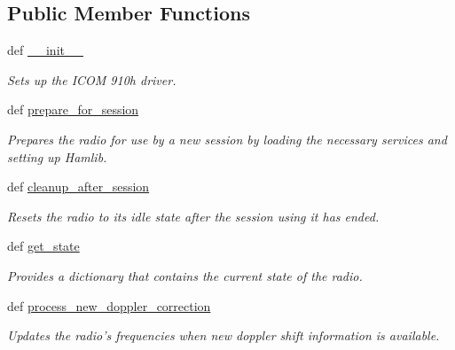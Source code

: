 \subsection*{Public Member Functions}
\begin{DoxyCompactItemize}
\item 
def \hyperlink{classhwm_1_1hardware_1_1devices_1_1drivers_1_1icom__910_1_1icom__910_1_1_i_c_o_m__910_a003a4b4561c4154eed9f426aa65d92a5}{\-\_\-\-\_\-init\-\_\-\-\_\-}
\begin{DoxyCompactList}\small\item\em Sets up the I\-C\-O\-M 910h driver. \end{DoxyCompactList}\item 
def \hyperlink{classhwm_1_1hardware_1_1devices_1_1drivers_1_1icom__910_1_1icom__910_1_1_i_c_o_m__910_ada23b5a1d234988015eb03a81d46f1db}{prepare\-\_\-for\-\_\-session}
\begin{DoxyCompactList}\small\item\em Prepares the radio for use by a new session by loading the necessary services and setting up Hamlib. \end{DoxyCompactList}\item 
\hypertarget{classhwm_1_1hardware_1_1devices_1_1drivers_1_1icom__910_1_1icom__910_1_1_i_c_o_m__910_a5cea763e2566f10885fa941b8ae7c8d4}{def \hyperlink{classhwm_1_1hardware_1_1devices_1_1drivers_1_1icom__910_1_1icom__910_1_1_i_c_o_m__910_a5cea763e2566f10885fa941b8ae7c8d4}{cleanup\-\_\-after\-\_\-session}}\label{classhwm_1_1hardware_1_1devices_1_1drivers_1_1icom__910_1_1icom__910_1_1_i_c_o_m__910_a5cea763e2566f10885fa941b8ae7c8d4}

\begin{DoxyCompactList}\small\item\em Resets the radio to its idle state after the session using it has ended. \end{DoxyCompactList}\item 
def \hyperlink{classhwm_1_1hardware_1_1devices_1_1drivers_1_1icom__910_1_1icom__910_1_1_i_c_o_m__910_a6ad77f3406eda709ddd6276ec54e9ecd}{get\-\_\-state}
\begin{DoxyCompactList}\small\item\em Provides a dictionary that contains the current state of the radio. \end{DoxyCompactList}\item 
def \hyperlink{classhwm_1_1hardware_1_1devices_1_1drivers_1_1icom__910_1_1icom__910_1_1_i_c_o_m__910_a155b59b30ef66d51d36ffb1ce4803270}{process\-\_\-new\-\_\-doppler\-\_\-correction}
\begin{DoxyCompactList}\small\item\em Updates the radio's frequencies when new doppler shift information is available. \end{DoxyCompactList}\end{DoxyCompactItemize}
